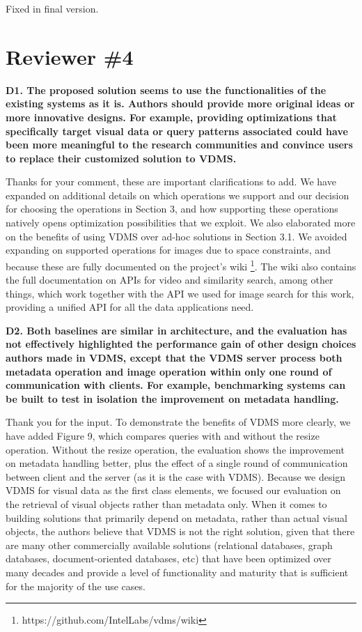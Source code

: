 \documentclass[11pt]{proposalnsf}
\begin{document}
Fixed in final version.

\bigskip

\newpage
\section{Reviewer \#4}

\noindent %
\textbf{
D1. The proposed solution seems to use the functionalities of the existing systems
as it is. Authors should provide more original ideas or more innovative designs.
For example, providing optimizations that specifically target visual data or query
patterns associated could have been more meaningful to the research communities and
convince users to replace their customized solution to VDMS.
}\bigskip

Thanks for your comment, these are important clarifications to add.
We have expanded on additional details on which operations we support and our
decision for choosing the operations in Section 3, and how supporting
these operations natively opens optimization possibilities that we exploit.
We also elaborated more on the benefits of
using VDMS over ad-hoc solutions in Section 3.1.
We avoided expanding on supported operations for images due to space constraints,
and because these are fully documented on the project's wiki
\footnote{https://github.com/IntelLabs/vdms/wiki}.
The wiki also contains the full documentation on APIs for video and similarity
search, among other things, which work together with the API we used for
image search for this work, providing a unified API for all the data applications need.

\bigskip
\noindent %
\textbf{
D2. Both baselines are similar in architecture, and the evaluation has not effectively
highlighted the performance gain of other design choices authors made in VDMS,
except that the VDMS server process both metadata operation and image operation
within only one round of communication with clients.
For example, benchmarking systems can be built to test in isolation the
improvement on metadata handling.
}\bigskip

Thank you for the input.
To demonstrate the benefits of VDMS more clearly, we have added Figure 9,
which compares queries with and without the resize operation.
Without the resize operation, the evaluation shows the
improvement on metadata handling better, plus the effect of a single round
of communication between client and the server (as it is the case with VDMS).
Because we design VDMS for visual data as the first class elements,
we focused our evaluation on the retrieval of visual objects rather
than metadata only.
When it comes to building solutions that primarily depend on metadata,
rather than actual visual objects, the authors believe that VDMS is not
the right solution, given that there are many other commercially available
solutions (relational databases, graph databases, document-oriented databases, etc)
that have been optimized over many decades and provide a level of
functionality and maturity that is sufficient for the majority of the use cases.
\end{document}
